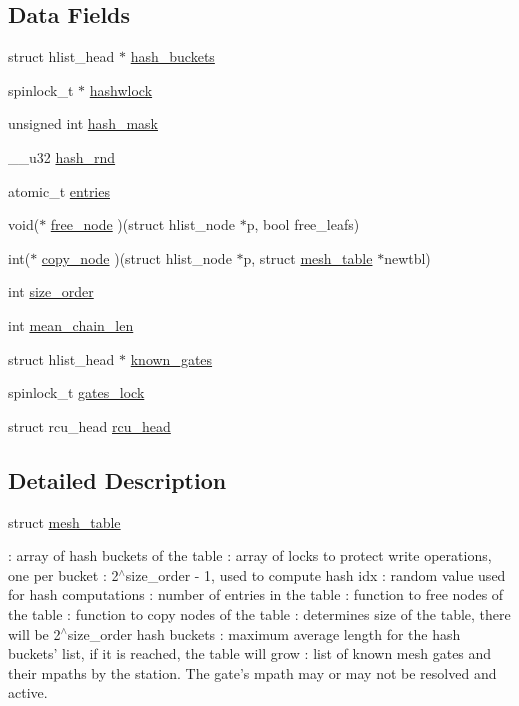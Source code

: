 \subsection*{Data Fields}
\begin{DoxyCompactItemize}
\item 
struct hlist\-\_\-head $\ast$ \hyperlink{structmesh__table_a04eadd518c34fb4fff4aaed97e1234e0}{hash\-\_\-buckets}
\item 
spinlock\-\_\-t $\ast$ \hyperlink{structmesh__table_a26e336e1f797741f588ac094b1ac0202}{hashwlock}
\item 
unsigned int \hyperlink{structmesh__table_a379901d7620aa43cd8472e2c189af861}{hash\-\_\-mask}
\item 
\-\_\-\-\_\-u32 \hyperlink{structmesh__table_aefd9eaac521878de0638370ef2c70d71}{hash\-\_\-rnd}
\item 
atomic\-\_\-t \hyperlink{structmesh__table_ad87bb8a66d6cd622bda213e2edf6c4a2}{entries}
\item 
void($\ast$ \hyperlink{structmesh__table_a9779fca079801066cd605af403cc1eea}{free\-\_\-node} )(struct hlist\-\_\-node $\ast$p, bool free\-\_\-leafs)
\item 
int($\ast$ \hyperlink{structmesh__table_ad8a4389f749adafe9393ad7be19be3bc}{copy\-\_\-node} )(struct hlist\-\_\-node $\ast$p, struct \hyperlink{structmesh__table}{mesh\-\_\-table} $\ast$newtbl)
\item 
int \hyperlink{structmesh__table_af2ece8f794fc2b70104b44cde3421003}{size\-\_\-order}
\item 
int \hyperlink{structmesh__table_a05410cec7cda00c16011e39666056c20}{mean\-\_\-chain\-\_\-len}
\item 
struct hlist\-\_\-head $\ast$ \hyperlink{structmesh__table_a3c40962f5ca0faa5387ad1e91a2c7ba6}{known\-\_\-gates}
\item 
spinlock\-\_\-t \hyperlink{structmesh__table_aa4d60ff62c57e22498c2aac249c29391}{gates\-\_\-lock}
\item 
struct rcu\-\_\-head \hyperlink{structmesh__table_ab698383409a24791490f962fe6990655}{rcu\-\_\-head}
\end{DoxyCompactItemize}


\subsection{Detailed Description}
struct \hyperlink{structmesh__table}{mesh\-\_\-table}

\-: array of hash buckets of the table \-: array of locks to protect write operations, one per bucket \-: 2$^\wedge$size\-\_\-order -\/ 1, used to compute hash idx \-: random value used for hash computations \-: number of entries in the table \-: function to free nodes of the table \-: function to copy nodes of the table \-: determines size of the table, there will be 2$^\wedge$size\-\_\-order hash buckets \-: maximum average length for the hash buckets' list, if it is reached, the table will grow \-: list of known mesh gates and their mpaths by the station. The gate's mpath may or may not be resolved and active.


